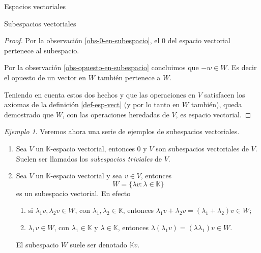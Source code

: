 \documentclass[a4paper,12pt,twoside,spanish,reqno]{amsbook}
\numberwithin{equation}{section}
\theoremstyle{definition}
\theoremstyle{remark}
\newtheorem*{ejemplo*}{Ejemplo}
\newcommand{\K}{\mathbb K}
\begin{document}
\begin{chapter}{Espacios vectoriales}
\begin{section}{Subespacios vectoriales}
\begin{proof}
        Por la observación \ref{obs-0-en-subespacio}, el $0$ del espacio vectorial pertenece al subespacio. 
        
       Por la observación  \ref{obs-opuesto-en-subespacio} concluimos que $-w\in W$. Es decir el opuesto de un vector en $W$ también pertenece a $W$. 
        
        Teniendo en cuenta estos dos hechos y que las operaciones en $V$ satisfacen los axiomas de la definición \ref{def-esp-vect} (y por lo tanto en $W$ también),  queda demostrado que $W$, con las operaciones heredadas de $V$, es espacio vectorial.  
    \end{proof}



\begin{ejemplo*} Veremos ahora una serie de ejemplos de subespacios vectoriales.
    \begin{enumerate}
        \item Sea $V$ un $\K$-espacio vectorial, entonces $0$ y $V$ son subespacios vectoriales de $V$. Suelen ser llamados los \textit{subespacios triviales} de $V$.
        
        \item Sea $V$ un $\K$-espacio vectorial y sea $v \in V$, entonces
        $$
        W = \{\lambda v: \lambda \in \K \}
        $$
        es un subespacio vectorial. En  efecto
        \begin{enumerate}
            \item si $\lambda_1v,\lambda_2v \in W$, con $\lambda_1,\lambda_2 \in \K$,  entonces $\lambda_1v + \lambda_2v = (\lambda_1+\lambda_2)v \in W$;
            \item  $\lambda_1v \in W$, con $\lambda_1 \in \K$ y $\lambda \in \K$,  entonces $\lambda(\lambda_1v) = (\lambda \lambda_1)v \in W$.
        \end{enumerate}
        El subespacio $W$ suele ser denotado $\K v$.
    

\end{enumerate}
\end{ejemplo*}
\end{section}
\end{chapter}
\end{document}
